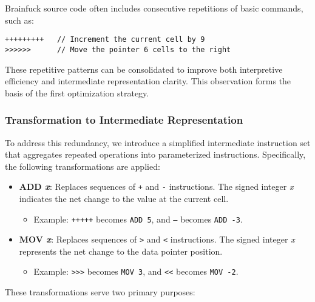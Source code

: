 \par Brainfuck source code often includes consecutive repetitions of basic commands, such as:

\begin{verbatim}
+++++++++   // Increment the current cell by 9
>>>>>>      // Move the pointer 6 cells to the right
\end{verbatim}

These repetitive patterns can be consolidated to improve both interpretive efficiency and intermediate representation clarity. This observation forms the basis of the first optimization strategy.

\subsubsection*{Transformation to Intermediate Representation}

To address this redundancy, we introduce a simplified intermediate instruction set that aggregates repeated operations into parameterized instructions. Specifically, the following transformations are applied:

\begin{itemize}
    \item \textbf{ADD \textit{x}}: Replaces sequences of \texttt{+} and \texttt{-} instructions. The signed integer \textit{x} indicates the net change to the value at the current cell.
    \begin{itemize}
        \item Example: \texttt{+++++} becomes \texttt{ADD 5}, and \texttt{---} becomes \texttt{ADD -3}.
    \end{itemize}

    \item \textbf{MOV \textit{x}}: Replaces sequences of \texttt{>} and \texttt{<} instructions. The signed integer \textit{x} represents the net change to the data pointer position.
    \begin{itemize}
        \item Example: \texttt{>>>} becomes \texttt{MOV 3}, and \texttt{<<} becomes \texttt{MOV -2}.
    \end{itemize}
\end{itemize}

These transformations serve two primary purposes:

